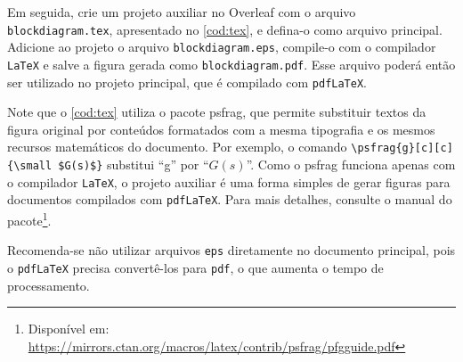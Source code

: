 Em seguida, crie um projeto auxiliar no Overleaf com o arquivo \texttt{blockdiagram.tex}, apresentado no \cref{cod:tex}, e defina-o como arquivo principal. Adicione ao projeto o arquivo \texttt{blockdiagram.eps}, compile-o com o compilador \texttt{LaTeX} e salve a figura gerada como \texttt{blockdiagram.pdf}. Esse arquivo poderá então ser utilizado no projeto principal, que é compilado com \texttt{pdfLaTeX}.



Note que o \cref{cod:tex} utiliza o pacote \textsf{psfrag}, que permite substituir textos da figura original por conteúdos formatados com a mesma tipografia e os mesmos recursos matemáticos do documento. Por exemplo, o comando \verb|\psfrag{g}[c][c]{\small $G(s)$}| substitui ``g'' por ``$G(s)$''. Como o \textsf{psfrag} funciona apenas com o compilador \texttt{LaTeX}, o projeto auxiliar é uma forma simples de gerar figuras para documentos compilados com \texttt{pdfLaTeX}. Para mais detalhes, consulte o manual do pacote\footnote{Disponível em: \url{https://mirrors.ctan.org/macros/latex/contrib/psfrag/pfgguide.pdf}}.

Recomenda-se não utilizar arquivos \texttt{eps} diretamente no documento principal, pois o \texttt{pdfLaTeX} precisa convertê-los para \texttt{pdf}, o que aumenta o tempo de processamento.